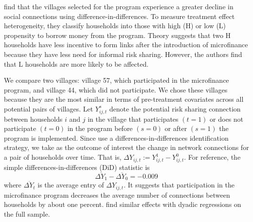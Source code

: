 \documentclass[12pt]{article}
\theoremstyle{definition}
\begin{document}
\cite{banerjee2021changes} find that the villages selected for the program experience a greater decline in social connections using difference-in-differences. To measure treatment effect heterogeneity, they classify households into those with high (H) or low (L) propensity to borrow money from the program.  Theory suggests that two H households have less incentive to form links after the introduction of microfinance because they have less need for informal risk sharing. However, the authors find that L households are more likely to be affected.    

We compare two villages: village 57, which participated in the microfinance program, and village 44, which did not participate. We chose these villages because they are the most similar in terms of pre-treatment covariates across all potential pairs of villages. Let $Y^{s}_{ij,t}$ denote the potential risk sharing connection between households $i$ and $j$ in the village that participates $(t= 1)$ or does not participate $(t=0)$ in the program before $(s = 0)$ or after $(s=1)$ the program is implemented. Since \cite{banerjee2021changes} use a differences-in-differences identification strategy, we take as the outcome of interest the change in network connections for a pair of households over time. That is, $\Delta Y_{ij, t} := Y^{1}_{ij,t} - Y^{0}_{ij,t}$. For reference, the simple differences-in-differences (DiD) statistic is  
\begin{equation*}
	\overline{\Delta Y_{1}} - \overline{\Delta Y_{0}} = -0.009
\end{equation*}
where $\overline{\Delta Y_{t}}$ is the average entry of $\Delta Y_{ij, t}$. It suggests that participation in the microfinance program decreases the average number of connections between households by about one percent. \cite{banerjee2021changes} find similar effects with dyadic regressions on the full sample.    
\end{document}
